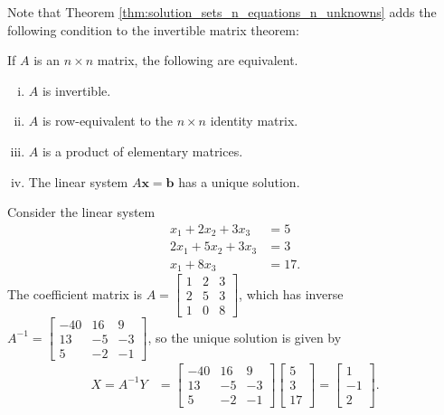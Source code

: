 \documentclass[12pt,letterpaper,reqno]{article}
\numberwithin{equation}{section}
\begin{document}
Note that Theorem \ref{thm:solution_sets_n_equations_n_unknowns} adds the following condition to the invertible matrix theorem:

\begin{thm}\label{thm:invertible_matrix_theorem_part_2}
	If $A$ is an $n \times n$ matrix, the following are equivalent.
	\begin{enumerate}[(i)]
		\item $A$ is invertible.
		\item $A$ is row-equivalent to the $n \times n$ identity matrix.
		\item $A$ is a product of elementary matrices.
		\item The linear system $A\mathbf{x}=\mathbf{b}$ has a unique solution.
	\end{enumerate} 	
\end{thm}

\begin{example}
Consider the linear system
\begin{align*}
	x_1+2x_2+3x_3&=5 \\
	2x_1+5x_2+3x_3&=3 \\
	x_1+8x_3&=17.
\end{align*}
The coefficient matrix is $A=\begin{bmatrix}
		1 & 2 & 3 \\ 2 & 5 & 3 \\ 1 & 0 & 8
	\end{bmatrix}$, which has inverse $A^{-1}=\begin{bmatrix}
		-40 & 16 & 9 \\ 13 & -5 & -3 \\ 5 & -2 & -1
	\end{bmatrix}$, so the unique solution is given by
	\begin{align*}
		X=A^{-1}Y&=\begin{bmatrix}
		-40 & 16 & 9 \\ 13 & -5 & -3 \\ 5 & -2 & -1
	\end{bmatrix}\begin{bmatrix}
		5 \\ 3 \\ 17
	\end{bmatrix}=\begin{bmatrix}
		1 \\ -1 \\2
	\end{bmatrix}.
	\end{align*}	
\end{example}
\end{document}
